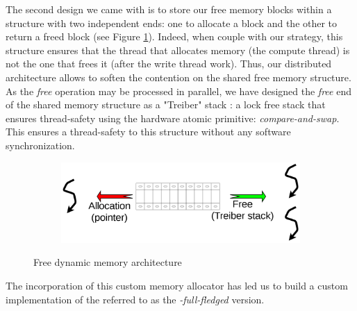			The second design we came with is to store our free memory blocks within a structure with two independent ends:  one to allocate a block and the other to return a freed block (see Figure \ref{fig:customMemAlloc_freePool}).   Indeed, when couple with our \notationaio\space strategy, this structure ensures that the thread that allocates memory (the compute thread) is not the one that frees it (after the write thread work).   Thus, our distributed architecture allows to soften the contention on the shared free memory structure.  As the \emph{free} operation may be processed in parallel, we have designed the \emph{free} end of the shared memory structure as a "Treiber" stack \cite{pedersen1998method}:   a lock free stack that ensures thread-safety using the hardware atomic primitive: \emph{compare-and-swap}\cite{valois1995lock}.   This ensures a thread-safety to this structure without any software synchronization.\\
				\begin{figure}[!h]
					\centering
					\begin{subfigure}[b]{0.7\textwidth}
						\centering
						\includegraphics[width=\textwidth]{charts/internship_juelich_customMemAlloc_freePool.png}
					\end{subfigure}
					\caption{Free dynamic memory architecture}
					\label{fig:customMemAlloc_freePool}
				\end{figure}

			The incorporation of this custom memory allocator has led us to build a custom implementation of the \toolTargetSoftware\space referred to as the \emph{\notationaio-full-fledged} version.


